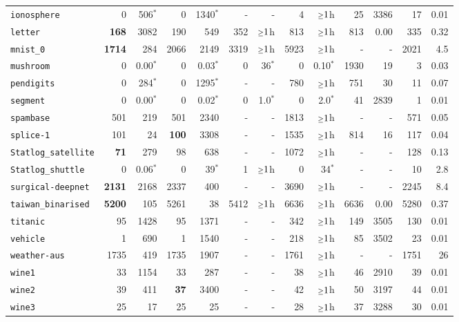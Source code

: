 \begin{tabular}{lrrrrrrrrrrrr}
\texttt{ionosphere} & 0 & 506$^*$ & 0 & 1340$^*$ & - & - & 4 & $\mathsmaller{\geq}1$h & 25 & 3386 & 17 & 0.01\\
\texttt{letter} & \textbf{168} & 3082 & 190 & 549 & 352 & $\mathsmaller{\geq}1$h & 813 & $\mathsmaller{\geq}1$h & 813 & 0.00 & 335 & 0.32\\
\texttt{mnist\_0} & \textbf{1714} & 284 & 2066 & 2149 & 3319 & $\mathsmaller{\geq}1$h & 5923 & $\mathsmaller{\geq}1$h & - & - & 2021 & 4.5\\
\texttt{mushroom} & 0 & 0.00$^*$ & 0 & 0.03$^*$ & 0 & 36$^*$ & 0 & 0.10$^*$ & 1930 & 19 & 3 & 0.03\\
\texttt{pendigits} & 0 & 284$^*$ & 0 & 1295$^*$ & - & - & 780 & $\mathsmaller{\geq}1$h & 751 & 30 & 11 & 0.07\\
\texttt{segment} & 0 & 0.00$^*$ & 0 & 0.02$^*$ & 0 & 1.0$^*$ & 0 & 2.0$^*$ & 41 & 2839 & 1 & 0.01\\
\texttt{spambase} & 501 & 219 & 501 & 2340 & - & - & 1813 & $\mathsmaller{\geq}1$h & - & - & 571 & 0.05\\
\texttt{splice-1} & 101 & 24 & \textbf{100} & 3308 & - & - & 1535 & $\mathsmaller{\geq}1$h & 814 & 16 & 117 & 0.04\\
\texttt{Statlog\_satellite} & \textbf{71} & 279 & 98 & 638 & - & - & 1072 & $\mathsmaller{\geq}1$h & - & - & 128 & 0.13\\
\texttt{Statlog\_shuttle} & 0 & 0.06$^*$ & 0 & 39$^*$ & 1 & $\mathsmaller{\geq}1$h & 0 & 34$^*$ & - & - & 10 & 2.8\\
\texttt{surgical-deepnet} & \textbf{2131} & 2168 & 2337 & 400 & - & - & 3690 & $\mathsmaller{\geq}1$h & - & - & 2245 & 8.4\\
\texttt{taiwan\_binarised} & \textbf{5200} & 105 & 5261 & 38 & 5412 & $\mathsmaller{\geq}1$h & 6636 & $\mathsmaller{\geq}1$h & 6636 & 0.00 & 5280 & 0.37\\
\texttt{titanic} & 95 & 1428 & 95 & 1371 & - & - & 342 & $\mathsmaller{\geq}1$h & 149 & 3505 & 130 & 0.01\\
\texttt{vehicle} & 1 & 690 & 1 & 1540 & - & - & 218 & $\mathsmaller{\geq}1$h & 85 & 3502 & 23 & 0.01\\
\texttt{weather-aus} & 1735 & 419 & 1735 & 1907 & - & - & 1761 & $\mathsmaller{\geq}1$h & - & - & 1751 & 26\\
\texttt{wine1} & 33 & 1154 & 33 & 287 & - & - & 38 & $\mathsmaller{\geq}1$h & 46 & 2910 & 39 & 0.01\\
\texttt{wine2} & 39 & 411 & \textbf{37} & 3400 & - & - & 42 & $\mathsmaller{\geq}1$h & 50 & 3197 & 44 & 0.01\\
\texttt{wine3} & 25 & 17 & 25 & 25 & - & - & 28 & $\mathsmaller{\geq}1$h & 37 & 3288 & 30 & 0.01\\
\bottomrule
\end{tabular}
